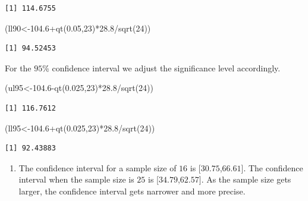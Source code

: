 \documentclass[
  letterpaper,
  DIV=11,
  numbers=noendperiod]{scrreprt}
\newenvironment{Shaded}{\begin{snugshade}}{\end{snugshade}}
\newcommand{\DecValTok}[1]{\textcolor[rgb]{0.68,0.00,0.00}{#1}}
\newcommand{\FloatTok}[1]{\textcolor[rgb]{0.68,0.00,0.00}{#1}}
\newcommand{\FunctionTok}[1]{\textcolor[rgb]{0.28,0.35,0.67}{#1}}
\newcommand{\NormalTok}[1]{\textcolor[rgb]{0.00,0.23,0.31}{#1}}
\newcommand{\OtherTok}[1]{\textcolor[rgb]{0.00,0.23,0.31}{#1}}
\newcommand{\SpecialCharTok}[1]{\textcolor[rgb]{0.37,0.37,0.37}{#1}}
\providecommand{\tightlist}{%
  \setlength{\itemsep}{0pt}\setlength{\parskip}{0pt}}\usepackage{longtable,booktabs,array}
\begin{document}
\begin{verbatim}
[1] 114.6755
\end{verbatim}

\begin{Shaded}
\begin{Highlighting}[numbers=left,,]
\NormalTok{(ll90}\OtherTok{\textless{}{-}}\FloatTok{104.6}\SpecialCharTok{+}\FunctionTok{qt}\NormalTok{(}\FloatTok{0.05}\NormalTok{,}\DecValTok{23}\NormalTok{)}\SpecialCharTok{*}\FloatTok{28.8}\SpecialCharTok{/}\FunctionTok{sqrt}\NormalTok{(}\DecValTok{24}\NormalTok{))}
\end{Highlighting}
\end{Shaded}

\begin{verbatim}
[1] 94.52453
\end{verbatim}

For the \(95\)\% confidence interval we adjust the significance level
accordingly.

\begin{Shaded}
\begin{Highlighting}[numbers=left,,]
\NormalTok{(ul95}\OtherTok{\textless{}{-}}\FloatTok{104.6}\SpecialCharTok{{-}}\FunctionTok{qt}\NormalTok{(}\FloatTok{0.025}\NormalTok{,}\DecValTok{23}\NormalTok{)}\SpecialCharTok{*}\FloatTok{28.8}\SpecialCharTok{/}\FunctionTok{sqrt}\NormalTok{(}\DecValTok{24}\NormalTok{))}
\end{Highlighting}
\end{Shaded}

\begin{verbatim}
[1] 116.7612
\end{verbatim}

\begin{Shaded}
\begin{Highlighting}[numbers=left,,]
\NormalTok{(ll95}\OtherTok{\textless{}{-}}\FloatTok{104.6}\SpecialCharTok{+}\FunctionTok{qt}\NormalTok{(}\FloatTok{0.025}\NormalTok{,}\DecValTok{23}\NormalTok{)}\SpecialCharTok{*}\FloatTok{28.8}\SpecialCharTok{/}\FunctionTok{sqrt}\NormalTok{(}\DecValTok{24}\NormalTok{))}
\end{Highlighting}
\end{Shaded}

\begin{verbatim}
[1] 92.43883
\end{verbatim}

\begin{enumerate}
\def\labelenumi{\arabic{enumi}.}
\setcounter{enumi}{1}
\tightlist
\item
  The confidence interval for a sample size of \(16\) is
  {[}\(30.75\),\(66.61\){]}. The confidence interval when the sample
  size is \(25\) is {[}\(34.79\),\(62.57\){]}. As the sample size gets
  larger, the confidence interval gets narrower and more precise.
\end{enumerate}
\end{document}

